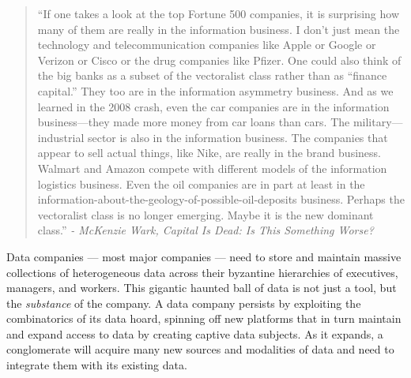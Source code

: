 \begin{quote}
``If one takes a look at the top Fortune 500 companies, it is surprising
how many of them are really in the information business. I don't just
mean the technology and telecommunication companies like Apple or Google
or Verizon or Cisco or the drug companies like Pfizer. One could also
think of the big banks as a subset of the vectoralist class rather than
as ``finance capital.'' They too are in the information asymmetry
business. And as we learned in the 2008 crash, even the car companies
are in the information business---they made more money from car loans
than cars. The military---industrial sector is also in the information
business. The companies that appear to sell actual things, like Nike,
are really in the brand business. Walmart and Amazon compete with
different models of the information logistics business. Even the oil
companies are in part at least in the
information-about-the-geology-of-possible-oil-deposits business. Perhaps
the vectoralist class is no longer emerging. Maybe it is the new
dominant class.'' \emph{- McKenzie Wark, Capital Is Dead: Is This
Something Worse?} \cite{warkCapitalDeadThis2021} 
\end{quote}

Data companies --- most major companies --- need to store and maintain
massive collections of heterogeneous data across their byzantine
hierarchies of executives, managers, and workers. This gigantic haunted
ball of data is not just a tool, but the \emph{substance} of the
company. A data company persists by exploiting the combinatorics of its
data hoard, spinning off new platforms that in turn maintain and expand
access to data by creating captive data subjects. As it expands, a
conglomerate will acquire many new sources and modalities of data and
need to integrate them with its existing data.

